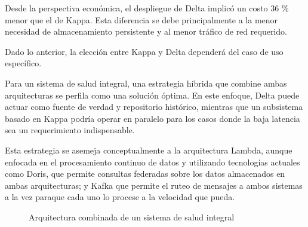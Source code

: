 \newpage

Desde la perspectiva económica, el despliegue de Delta implicó un costo 36 \% menor que el de Kappa. 
Esta diferencia se debe principalmente a la menor necesidad de almacenamiento persistente y al menor tráfico de red requerido.\newline

Dado lo anterior, la elección entre Kappa y Delta dependerá del caso de uso específico.

Para un sistema de salud integral, una estrategia híbrida que combine ambas arquitecturas se perfila como una solución óptima. 
En este enfoque, Delta puede actuar como fuente de verdad y repositorio histórico, 
mientras que un subsistema basado en Kappa podría operar en paralelo para los casos donde la baja latencia sea un requerimiento indispensable. \newline

Esta estrategia se asemeja conceptualmente a la arquitectura Lambda, 
aunque enfocada en el procesamiento continuo de datos y utilizando tecnologías actuales como Doris, 
que permite consultas federadas sobre los datos almacenados en ambas arquitecturas; 
y Kafka que permite el ruteo de mensajes a ambos sistemas a la vez paraque cada uno lo procese a la velocidad que pueda.

\begin{figure}[h]
    \caption{Arquitectura combinada de un sistema de salud integral} 
    \label{fig:des_arquitectura_combinada}
\end{figure}